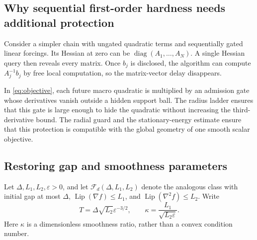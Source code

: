 \documentclass[11pt]{article}
\theoremstyle{definition}
\theoremstyle{remark}
\newcommand{\eps}{\varepsilon}
\newcommand{\Lip}{\operatorname{Lip}}
\newcommand{\diag}{\operatorname{diag}}
\begin{document}
\subsection{Why sequential first-order hardness needs additional protection}
Consider a simpler chain with ungated quadratic terms and sequentially
gated linear forcings. Its Hessian at zero can be
$\diag(A_1,\ldots,A_N)$. A single Hessian query then reveals every matrix.
Once $b_j$ is disclosed, the algorithm can compute $A_j^{-1}b_j$ by free
local computation, so the matrix-vector delay disappears.

In \eqref{eq:objective}, each future macro quadratic is multiplied by
an admission gate whose derivatives vanish outside a hidden support ball.
The radius ladder ensures that this gate is large enough to hide the
quadratic without increasing the third-derivative bound. The radial guard
and the stationary-energy estimate ensure that this protection is
compatible with the global geometry of one smooth scalar objective.

\subsection{Restoring gap and smoothness parameters}
Let $\Delta,L_1,L_2,\eps>0$, and let
$\mathcal F_d(\Delta,L_1,L_2)$ denote the analogous class with
initial gap at most $\Delta$, $\Lip(\nabla f)\le L_1$, and
$\Lip(\nabla^2f)\le L_2$. Write
\begin{equation}\label{eq:general-parameters}
 T=\Delta\sqrt{L_2}\eps^{-3/2},
 \qquad
 \kappa=\frac{L_1}{\sqrt{L_2\eps}}.
\end{equation}
Here $\kappa$ is a dimensionless smoothness ratio, rather than a convex
condition number.
\end{document}
